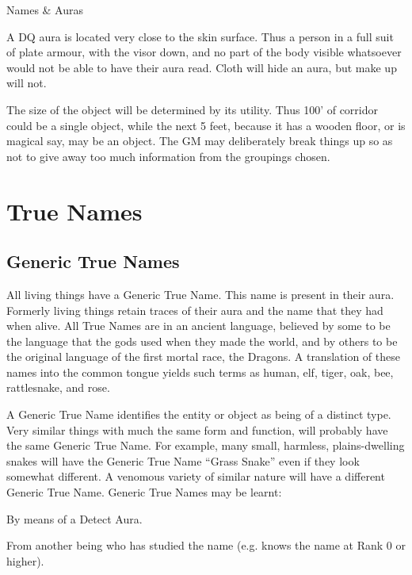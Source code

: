 \begin{Chapter}{Names \& Auras}
\begin{Enumerate}
\item A DQ aura is located very close to the skin surface.  Thus a
  person in a full suit of plate armour, with the visor down, and no
  part of the body visible whatsoever would not be able to have their
  aura read. Cloth will hide an aura, but make up will not.

\item The size of the object will be determined by its utility.  Thus
  100’ of corridor could be a single object, while the next 5 feet,
  because it has a wooden floor, or is magical say, may be an object.
  The GM may deliberately break things up so as not to give away too
  much information from the groupings chosen.

\end{Enumerate}


\section{True Names}

\subsection{Generic True Names}

All living things have a Generic True Name.  This name is present in
their aura.  Formerly living things retain traces of their aura and
the name that they had when alive.  All True Names are in an ancient
language, believed by some to be the language that the gods used when
they made the world, and by others to be the original language of the
first mortal race, the Dragons. A translation of these names into the
common tongue yields such terms as human, elf, tiger, oak, bee,
rattlesnake, and rose.

A Generic True Name identifies the entity or object as being of a
distinct type. Very similar things with much the same form and
function, will probably have the same Generic True Name.  For example,
many small, harmless, plains-dwelling snakes will have the Generic
True Name “Grass Snake” even if they look somewhat different. A
venomous variety of similar nature will have a different Generic True
Name. Generic True Names may be learnt:

\begin{Itemize}

\item By means of a Detect Aura.  

\item From another being who has studied the name (e.g. knows the name
  at Rank 0 or higher).


\end{Itemize}
\end{Chapter}

